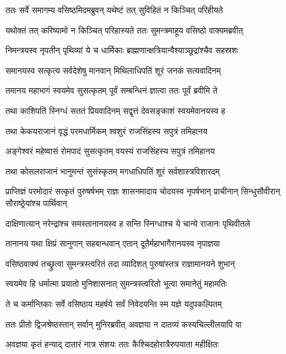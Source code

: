 \twolineshloka
{ततः सर्वे समागम्य वसिष्ठमिदमब्रुवन्}
{यथेष्टं तत् सुविहितं न किञ्चित् परिहीयते} %

\twolineshloka
{यथोक्तं तत् करिष्यामो न किञ्चित् परिहास्यते}
{ततः सुमन्त्रमाहूय वसिष्ठो वाक्यमब्रवीत्} %

\twolineshloka
{निमन्त्रयस्व नृपतीन् पृथिव्यां ये च धार्मिकाः}
{ब्राह्मणान्क्षत्रियान्वैश्याञ्छूद्रांश्चैव सहस्रशः} %

\twolineshloka
{समानयस्व सत्कृत्य सर्वदेशेषु मानवान्}
{मिथिलाधिपतिं शूरं जनकं सत्यवादिनम्} %

\twolineshloka
{तमानय महाभागं स्वयमेव सुसत्कृतम्}
{पूर्वं सम्बन्धिनं ज्ञात्वा ततः पूर्वं ब्रवीमि ते} %

\twolineshloka
{तथा काशिपतिं स्निग्धं सततं प्रियवादिनम्}
{सद्वृत्तं देवसङ्काशं स्वयमेवानयस्व ह} %

\twolineshloka
{तथा केकयराजानं वृद्धं परमधार्मिकम्}
{श्वशुरं राजसिंहस्य सपुत्रं तमिहानय} %

\twolineshloka
{अङ्गेश्वरं महेष्वासं रोमपादं सुसत्कृतम्}
{वयस्यं राजसिंहस्य सपुत्रं तमिहानय} %

\twolineshloka
{तथा कोसलराजानं भानुमन्तं सुसंस्कृतम्}
{मगधाधिपतिं शूरं सर्वशास्त्रविशारदम्} %

\threelineshloka
{प्राप्तिज्ञं परमोदारं सत्कृतं पुरुषर्षभम्}
{राज्ञः शासनमादाय चोदयस्व नृपर्षभान्}
{प्राचीनान् सिन्धुसौवीरान् सौराष्ठ्रेयांश्च पार्थिवान्} %

\twolineshloka
{दाक्षिणात्यान् नरेन्द्रांश्च समस्तानानयस्व ह}
{सन्ति स्निग्धाश्च ये चान्ये राजानः पृथिवीतले} %

\twolineshloka
{तानानय यथा क्षिप्रं सानुगान् सहबान्धवान्}
{एतान् दूतैर्महाभागैरानयस्व नृपाज्ञया} %

\twolineshloka
{वसिष्ठवाक्यं तच्छ्रुत्वा सुमन्त्रस्त्वरितं तदा}
{व्यादिशत् पुरुषांस्तत्र राज्ञामानयने शुभान्} %

\twolineshloka
{स्वयमेव हि धर्मात्मा प्रयातो मुनिशासनात्}
{सुमन्त्रस्त्वरितो भूत्वा समानेतुं महामतिः} %

\twolineshloka
{ते च कर्मान्तिकाः सर्वे वसिष्ठाय महर्षये}
{सर्वं निवेदयन्ति स्म यज्ञे यदुपकल्पितम्} %

\twolineshloka
{ततः प्रीतो द्विजश्रेष्ठस्तान् सर्वान् मुनिरब्रवीत्}
{अवज्ञया न दातव्यं कस्यचिल्लीलयापि वा} %

\twolineshloka
{अवज्ञया कृतं हन्याद् दातारं नात्र संशयः}
{ततः कैश्चिदहोरात्रैरुपयाता महीक्षितः} %

